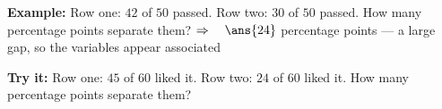 \documentclass[12pt]{article}
\begin{document}
\begin{examplebox}
\textbf{Example:} \quad Row one: $42$ of $50$ passed. Row two: $30$ of $50$ passed. How many
percentage points separate them?
$\Rightarrow\quad \ans{24}$ percentage points --- a large gap, so the variables appear associated
\end{examplebox}

\begin{tryitbox}
\textbf{Try it:} \quad Row one: $45$ of $60$ liked it. Row two: $24$ of $60$ liked it. How many
percentage points separate them?\\[2pt]
\end{tryitbox}
\end{document}
